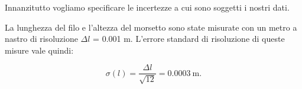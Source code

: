Innanzitutto vogliamo specificare le incertezze a cui sono soggetti i nostri dati.

La lunghezza del filo e l'altezza del morsetto sono state misurate con un metro a nastro di risoluzione
$\Delta l$ = 0.001 m. L'errore standard di risoluzione di queste misure vale quindi:

\begin{equation}
    \sigma(l) = \frac{\Delta l}{\sqrt{12}} = \SI{0.0003}{\metre}.
\end{equation}


